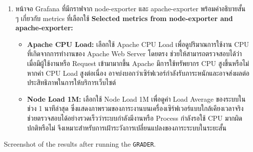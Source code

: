 \documentclass[a4paper, 10pt]{article}
\begin{document}
\begin{solution}
\begin{enumerate}[label=2.\arabic*.]
\begin{enumerate}[label*=\arabic*.]
		      \end{enumerate}
		\item \textthai{หน้าจอ} Grafana \textthai{ที่มีกราฟจาก} node-exporter
		      \textthai{และ} apache-exporter \textthai{พร้อมคำอธิบายสั้น ๆ เกี่ยวกับ} metrics \textthai{ที่เลือกใช้}
					\textbf{Selected metrics from node-exporter and apache-exporter:}
					\begin{itemize}
						\item \textbf{Apache CPU Load:}
									\textthai{เลือกใช้} Apache CPU Load \textthai{เพื่อดูปริมาณการใช้งาน} CPU
									\textthai{ที่เกิดจากการทำงานของ} Apache Web Server
									\textthai{โดยตรง ช่วยให้สามารถตรวจสอบได้ว่าเมื่อมีผู้ใช้งานหรือ} Request \textthai{เข้ามามากขึ้น}
									Apache \textthai{มีการใช้ทรัพยากร} CPU \textthai{สูงขึ้นหรือไม่}
									\textthai{หากค่า} CPU Load \textthai{สูงต่อเนื่อง อาจบ่งบอกว่าเซิร์ฟเวอร์กำลังรับภาระหนักและอาจส่งผลต่อประสิทธิภาพในการให้บริการเว็บไซต์}
						\item \textbf{Node Load 1M:}
									\textthai{เลือกใช้} Node Load 1M \textthai{เพื่อดูค่า} Load Average
									\textthai{ของระบบในช่วง 1 นาทีล่าสุด ซึ่งแสดงภาพรวมของภาระงานบนเครื่องเซิร์ฟเวอร์แบบใกล้เคียงเวลาจริง}
									\textthai{ช่วยตรวจสอบได้อย่างรวดเร็วว่าระบบกำลังมีงานหรือ} Process \textthai{กำลังรอใช้} CPU
									\textthai{มากผิดปกติหรือไม่ จึงเหมาะสำหรับการเฝ้าระวังการเปลี่ยนแปลงของภาระระบบในระยะสั้น}
					\end{itemize}
	\end{enumerate}
\end{solution}

\begin{problem}
Screenshot of the results after running the \texttt{GRADER}.
\end{problem}

\begin{solution}
\end{solution}
\end{document}
